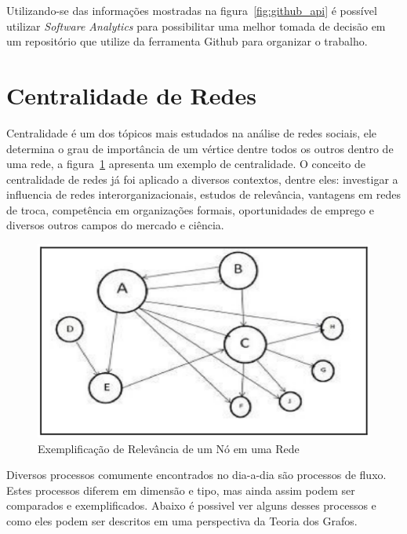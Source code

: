 Utilizando-se das informações mostradas na figura~\ref{fig:github_api} é possível utilizar
\textit{Software Analytics} para possibilitar uma melhor tomada de decisão em um
repositório que utilize da ferramenta Github para organizar o trabalho.

\section{Centralidade de Redes}
\label{ref:cen}
Centralidade é um dos tópicos mais estudados na análise de redes sociais, ele 
determina o grau de importância de um vértice dentre todos os outros dentro de uma 
rede, a figura~\ref{fig:centrality} apresenta um exemplo de centralidade. 
O conceito de centralidade de redes já foi aplicado a diversos contextos, dentre eles: investigar a influencia 
de redes interorganizacionais, estudos de relevância, vantagens em redes de troca, 
competência em organizações formais, oportunidades de emprego e diversos outros campos 
do mercado e ciência\cite{centrality}.

\begin{figure}[h]
    \centering
        \includegraphics[keepaspectratio=true,scale=0.5]{figuras/centrality.eps}
    \caption{Exemplificação de Relevância de um Nó em uma Rede}
    \label{fig:centrality}
\end{figure}

Diversos processos comumente encontrados no dia-a-dia são processos de fluxo. Estes
processos diferem em dimensão e tipo, mas ainda assim podem ser comparados e exemplificados.
Abaixo é possivel ver alguns desses processos e como eles podem ser descritos em uma perspectiva
da Teoria dos Grafos\cite{ceflow}.  

